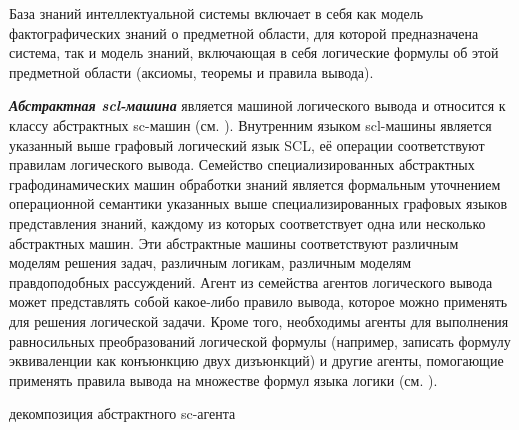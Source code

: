 База знаний интеллектуальной системы включает в себя как модель фактографических знаний о предметной области, для которой предназначена система, так и модель знаний, включающая в себя логические формулы об этой предметной области (аксиомы, теоремы и правила вывода).

\textit{\textbf{Абстрактная scl-машина}} является машиной логического вывода и относится к классу абстрактных sc-машин (см. ). Внутренним языком scl-машины является указанный выше графовый логический язык SCL, её операции соответствуют правилам логического вывода. Семейство специализированных абстрактных графодинамических машин обработки знаний является формальным уточнением операционной семантики указанных выше специализированных графовых языков представления знаний, каждому из которых соответствует одна или несколько абстрактных машин. Эти абстрактные машины соответствуют различным моделям решения задач, различным логикам, различным моделям правдоподобных рассуждений. 
Агент из семейства агентов логического вывода может представлять собой какое-либо правило вывода, которое можно применять для решения логической задачи. Кроме того, необходимы агенты для выполнения равносильных преобразований логической формулы (например, записать формулу эквиваленции как конъюнкцию двух дизъюнкций) и другие агенты, помогающие применять правила вывода на множестве формул языка логики (см. ).

\begin{SCn}
	\begin{scnrelfromset}{декомпозиция абстрактного sc-агента}
	\end{scnrelfromset}
\begin{scnindent}
\end{scnindent}
\end{SCn}

